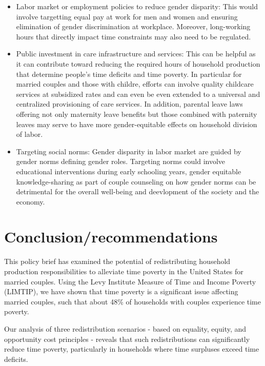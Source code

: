 \documentclass[
  11pt,
]{article}
\providecommand{\tightlist}{%
  \setlength{\itemsep}{0pt}\setlength{\parskip}{0pt}}\usepackage{longtable,booktabs,array}
\begin{document}
\begin{itemize}
\tightlist
\item
  Labor market or employment policies to reduce gender disparity: This
  would involve targetting equal pay at work for men and women and
  ensuring elimination of gender discrimination at workplace. Moreover,
  long-working hours that directly impact time constraints may also need
  to be regulated.
\item
  Public investment in care infrastructure and services: This can be
  helpful as it can contribute toward reducing the required hours of
  household production that determine people's time deficits and time
  poverty. In particular for married couples and those with childre,
  efforts can involve quality childcare services at subsidized rates and
  can even be even extended to a universal and centralized provisioning
  of care services. In addition, parental leave laws offering not only
  maternity leave benefits but those combined with paternity leaves may
  serve to have more gender-equitable effects on household division of
  labor.
\item
  Targeting social norms: Gender disparity in labor market are guided by
  gender norms defining gender roles. Targeting norms could involve
  educational interventions during early schooling years, gender
  equitable knowledge-sharing as part of couple counseling on how gender
  norms can be detrimental for the overall well-being and deevlopment of
  the society and the economy.
\end{itemize}

\section{Conclusion/recommendations}\label{conclusionrecommendations}

This policy brief has examined the potential of redistributing household
production responsibilities to alleviate time poverty in the United
States for married couples. Using the Levy Institute Measure of Time and
Income Poverty (LIMTIP), we have shown that time poverty is a
significant issue affecting married couples, such that about 48\% of
households with couples experience time poverty.

Our analysis of three redistribution scenarios - based on equality,
equity, and opportunity cost principles - reveals that such
redistributions can significantly reduce time poverty, particularly in
households where time surpluses exceed time deficits.
\end{document}

